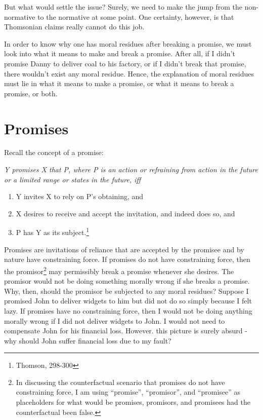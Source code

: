 But what would settle the issue? Surely, we need to make the jump from
the non-normative to the normative at some point. One certainty,
however, is that Thomsonian claims really cannot do this job.

In order to know why one has moral residues after breaking a promise, we
must look into what it means to make and break a promise. After all, if
I didn't promise Danny to deliver coal to his factory, or if I didn't
break that promise, there wouldn't exist any moral residue. Hence, the
explanation of moral residues must lie in what it means to make a
promise, or what it means to break a promise, or both.

\section{Promises}

Recall the concept of a promise:

\begin{displayquote} \def\labelenumi{(\arabic{enumi})}
	\itshape Y promises X that P, where P is an action or refraining from
action in the future or a limited range or states in the future, iff
	\begin{enumerate}
		\item Y invites X to rely on P's obtaining, and
		\item  X desires to receive and accept the invitation, and indeed
does so, and
		\item P has Y as its subject.\footnote{Thomson, 298-300}
	\end{enumerate}
\end{displayquote}

\noindent Promises are invitations of reliance that are accepted by the promisee
and by nature have constraining force. If promises do not have
constraining force, then the promisor\footnote{In discussing the
  counterfactual scenario that promises do not have constraining force,
  I am using ``promise'', ``promisor'', and ``promisee'' as placeholders
  for what would be promises, promisors, and promisees had the
  counterfactual been false.} may permissibly break a promise whenever
she desires. The promisor would not be doing something morally wrong if
she breaks a promise. Why, then, should the promisor be subjected to any
moral residues? Suppose I promised John to deliver widgets to him but
did not do so simply because I felt lazy. If promises have no
constraining force, then I would not be doing anything morally wrong if
I did not deliver widgets to John. I would not need to compensate John
for his financial loss. However. this picture is surely absurd - why
should John suffer financial loss due to my fault?

